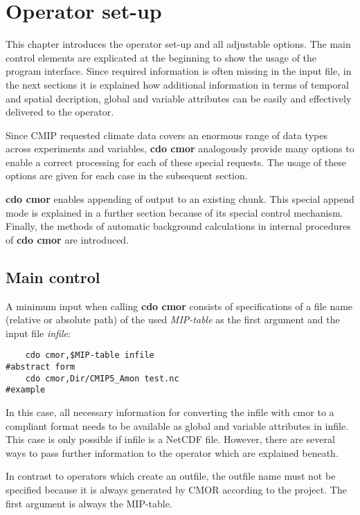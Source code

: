 \renewcommand{\textsc}{\texttt}

\chapter{Operator set-up}

This chapter introduces the operator set-up and all adjustable options. The main control elements are explicated at the beginning to show the usage of the program interface. Since required information is often missing in the input file, in the next sections it is explained how additional information in terms of temporal and spatial decription, global and variable attributes can be easily and effectively delivered to the operator.

Since CMIP requested climate data covers an enormous range of data types across experiments and variables, \textbf{cdo cmor} analogously provide many options to enable a correct processing for each of these special requests. The usage of these options are given for each case in the subsequent section.

\textbf{cdo cmor} enables appending of output to an existing chunk. This special append mode is explained in a further section because of its special control mechanism. Finally, the methods of automatic background calculations in internal procedures of \textbf{cdo cmor} are introduced.   

\section{Main control}

A minimum input when calling \textbf{cdo cmor} consists of specifications of a file name (relative or absolute path) of the used \textit{MIP-table} as the first argument and the input file \textit{infile}:

\begin{verbatim}
    cdo cmor,$MIP-table infile                                     #abstract form
    cdo cmor,Dir/CMIP5_Amon test.nc                                #example
\end{verbatim}

In this case, all necessary information for converting the infile with cmor to a compliant format needs to be available as global and variable attributes in infile. This case is only possible if infile is a NetCDF file. However, there are several ways to pass further information to the operator which are explained beneath.

In contrast to operators which create an outfile, the outfile name must not be specified because it is always generated by CMOR according to the project. The first argument is always the MIP-table.

